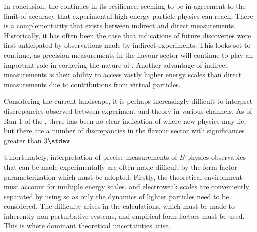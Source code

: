 In conclusion, the \sm continues in its resilience, seeming to be in agreement to the limit of
accuracy that experimental high energy particle physics can reach.
There is a complementarity that exists between indirect and direct measurements.
Historically, it has often been the case that indications of future discoveries were first
anticipated by observations made by indirect experiments.
This looks set to continue,
as precision measurements in the flavour sector will continue to play an important role in
cornering the nature of \np.
Another advantage of indirect measurements is their ability to access vastly higher energy scales
than direct measurements due to contributions from virtual particles.

Considering the current landscape, it is perhaps increasingly difficult to interpret
discrepancies observed between experiment and theory in various channels.
As of Run 1 of the \lhc, there has been no clear indication of where new physics may lie,
but there are a number of discrepancies in the flavour sector with significances greater than
$3\stdev$.


Unfortunately, interpretation of precise measurements of $B$ physics observables that can be made
experimentally are often made difficult by the form-factor parameterization which must be adopted.
Firstly, the theoretical environment must account for multiple energy scales.
\np and electroweak scales are conveniently separated by using \EFT
so as only the dynamics of lighter particles need to be considered.
The difficulty arises in the \QCD calculations, which must be made to inherently non-perturbative
systems, and empirical form-factors must be used.
This is where dominant theoretical uncertainties arise.

